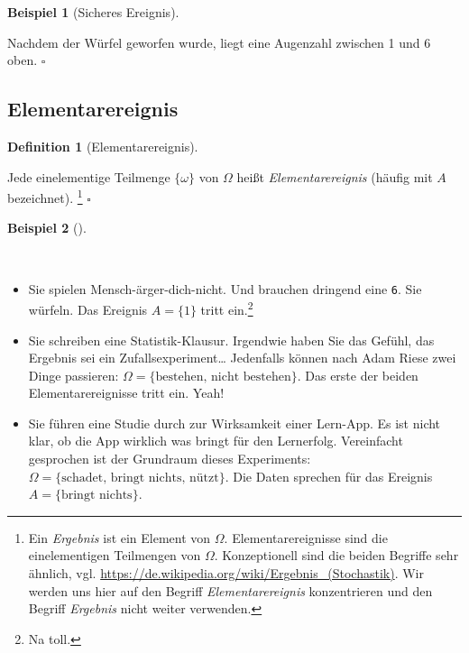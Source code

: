 \documentclass[
  ngerman,
  letterpaper,
  twoside,
  open=any]{scrbook}
\providecommand{\tightlist}{%
  \setlength{\itemsep}{0pt}\setlength{\parskip}{0pt}}\usepackage{longtable,booktabs,array}
\theoremstyle{definition}
\newtheorem{example}{Beispiel}[chapter]
\theoremstyle{plain}
\theoremstyle{definition}
\theoremstyle{definition}
\newtheorem{definition}{Definition}[chapter]
\theoremstyle{remark}
\begin{document}
\begin{example}[Sicheres
Ereignis]\protect\hypertarget{exm-sicher}{}\label{exm-sicher}

Nachdem der Würfel geworfen wurde, liegt eine Augenzahl zwischen 1 und 6
oben. \(\square\)

\end{example}

\subsection{Elementarereignis}\label{elementarereignis}

\begin{definition}[Elementarereignis]\protect\hypertarget{def-defelementarereignis}{}\label{def-defelementarereignis}

Jede einelementige Teilmenge \(\{\omega\}\) von \(\Omega\) heißt
\emph{Elementarereignis} (häufig mit \(A\) bezeichnet). \footnote{Ein
  \emph{Ergebnis} ist ein Element von \(\Omega\). Elementarereignisse
  sind die einelementigen Teilmengen von \(\Omega\). Konzeptionell sind
  die beiden Begriffe sehr ähnlich, vgl.
  \url{https://de.wikipedia.org/wiki/Ergebnis_(Stochastik)}. Wir werden
  uns hier auf den Begriff \emph{Elementarereignis} konzentrieren und
  den Begriff \emph{Ergebnis} nicht weiter verwenden.} \(\square\)

\end{definition}

\begin{example}[]\protect\hypertarget{exm-exmelementarereignis}{}\label{exm-exmelementarereignis}

~

\begin{itemize}
\tightlist
\item
  Sie spielen Mensch-ärger-dich-nicht. Und brauchen dringend eine
  \texttt{6}. Sie würfeln. Das Ereignis \(A = \{1\}\) tritt
  ein.\footnote{Na toll.}
\item
  Sie schreiben eine Statistik-Klausur. Irgendwie haben Sie das Gefühl,
  das Ergebnis sei ein Zufallsexperiment\ldots{} Jedenfalls können nach
  Adam Riese zwei Dinge passieren:
  \(\Omega= \{\text{bestehen, nicht bestehen}\}\). Das erste der beiden
  Elementarereignisse tritt ein. Yeah!
\item
  Sie führen eine Studie durch zur Wirksamkeit einer Lern-App. Es ist
  nicht klar, ob die App wirklich was bringt für den Lernerfolg.
  Vereinfacht gesprochen ist der Grundraum dieses Experiments:
  \(\Omega = \{\text{schadet, bringt nichts, nützt}\}\). Die Daten
  sprechen für das Ereignis \(A = \{\text{bringt nichts}\}\).
\end{itemize}

\end{example}
\end{document}
